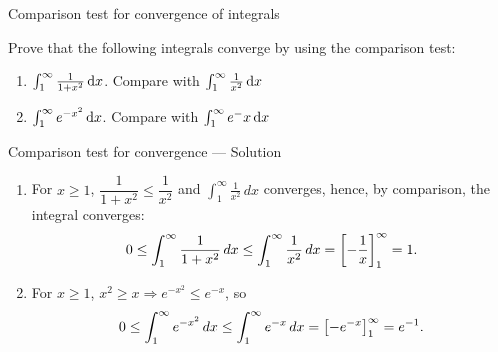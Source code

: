 \documentclass[9pt]{beamer}
\begin{document}
\begin{frame}{Comparison test for convergence of integrals}

    Prove that the following integrals converge by using the comparison test:

    \begin{enumerate}[leftmargin = 0.5cm, label = (\alph*), rightmargin = 0.2cm]
        
        \item $\int_1^\infty \frac{1}{1 + x^2}\,\mathrm{d} x$. Compare with $\int_1^\infty \frac{1}{x^2}\,\mathrm{d} x$

        \item $\int_1^\infty e^{-x^2}\,\mathrm{d} x$. Compare with $\int_1^\infty e^-x\,\mathrm{d} x$

    \end{enumerate}
    
\end{frame}

\begin{frame}{Comparison test for convergence — Solution}
    \small
    \begin{enumerate}[leftmargin=0.5cm,label=(\alph*),rightmargin=0.2cm]
      \item 
      For $x\ge 1$, $\dfrac{1}{1+x^{2}}\le \dfrac{1}{x^{2}}$ and $\displaystyle \int_{1}^{\infty}\frac{1}{x^{2}}\,dx$ converges, hence, by comparison, the integral converges:
        $$
        0 \leq \int_{1}^{\infty}\frac{1}{1+x^{2}}\,dx \leq\int_{1}^{\infty}\frac{1}{x^{2}}\,dx = \left[-\frac{1}{x}\right]_1^\infty = 1.
        $$
      \item 
      For $x\ge 1$, $x^{2}\ge x \Rightarrow e^{-x^{2}}\le e^{-x}$, so
      \[
      0 \leq \int_{1}^{\infty}e^{-x^{2}}\,dx \leq \int_{1}^{\infty}e^{-x}\,dx = \left[-e^{-x}\right]_1^\infty = e^{-1}.
      \]
    \end{enumerate}
\end{frame}
\end{document}
